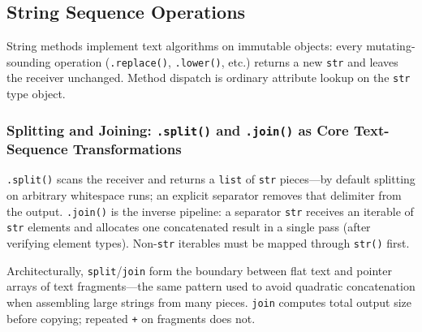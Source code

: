\subsection{String Sequence Operations}

String methods implement text algorithms on immutable objects: every mutating-sounding operation (\texttt{.replace()}, \texttt{.lower()}, etc.) returns a new \texttt{str} and leaves the receiver unchanged. Method dispatch is ordinary attribute lookup on the \texttt{str} type object.

\subsubsection{Splitting and Joining: \texttt{.split()} and \texttt{.join()} as Core Text-Sequence Transformations}

\texttt{.split()} scans the receiver and returns a \texttt{list} of \texttt{str} pieces---by default splitting on arbitrary whitespace runs; an explicit separator removes that delimiter from the output. \texttt{.join()} is the inverse pipeline: a separator \texttt{str} receives an iterable of \texttt{str} elements and allocates one concatenated result in a single pass (after verifying element types). Non-\texttt{str} iterables must be mapped through \texttt{str()} first.

Architecturally, \texttt{split}/\texttt{join} form the boundary between flat text and pointer arrays of text fragments---the same pattern used to avoid quadratic concatenation when assembling large strings from many pieces. \texttt{join} computes total output size before copying; repeated \texttt{+} on fragments does not.
